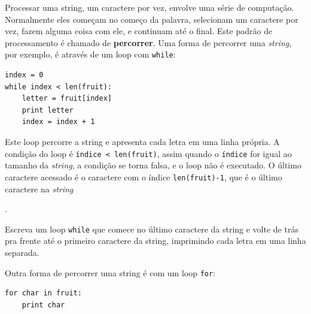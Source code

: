 {{%

Processar uma string, um caractere por vez, envolve uma série de computação.
Normalmente eles começam no começo da palavra, selecionam um caractere por
vez, fazem alguma coisa com ele, e continuam até o final. Este padrão de
processamento é chamado de {\bf percorrer}. Uma forma de percorrer uma 
{\it string}, por exemplo, é através de um loop com {\tt while}:

\beforeverb
\begin{verbatim}
index = 0
while index < len(fruit):
    letter = fruit[index]
    print letter
    index = index + 1
\end{verbatim}
\afterverb
%
%
Este loop percorre a string e apresenta cada letra em uma linha própria. A
condição do loop é {\tt índice < len(fruit)}, assim quando o {\tt índice} for
igual ao tamanho da {\it string}, a condição se torna falsa, e o loop não é
executado. O último caractere acessado é o caractere com o índice
{\tt len(fruit)-1}, que é o último caractere na {\it string}}.

\begin{ex}

Escreva um loop {\tt while} que comece no último caractere da string e volte
de trás pra frente até o primeiro caractere da string, imprimindo cada letra
em uma linha separada.
\end{ex}


Outra forma de percorrer uma string é com um loop {\tt for}:

\beforeverb
\begin{verbatim}
for char in fruit:
    print char
\end{verbatim}
\afterverb
%

}
